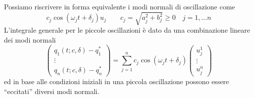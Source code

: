 \documentclass[11pt,a4paper,twoside]{book}
\theoremstyle{esss}
\theoremstyle{dotless}
\numberwithin{equation}{section} %
\begin{document}
Possiamo riscrivere in forma equivalente i modi normali di oscillazione come
\begin{equation}
c_j\cos{(\omega_jt+\delta_j)}u_j \qquad c_j=\sqrt{a_j^2+b_j^2}\geq 0 \quad j=1,\dots n
\end{equation}
L'integrale generale per le piccole oscillazioni è dato da una combinazione lineare dei modi normali
\begin{equation}
\left(\begin{array}{c}
q_1(t;c,\delta)-q_1^*\\\vdots\\q_n(t;c,\delta)-q_n^*
\end{array}\right)=\sum_{j=1}^n c_j\cos{(\omega_jt+\delta_j)}\left(\begin{array}{c}
u_j^1\\ \vdots\\u_j^n
\end{array}\right)
\end{equation}
ed in base alle condizioni iniziali in una piccola oscillazione possono essere ``eccitati'' diversi modi normali.
\end{document}
